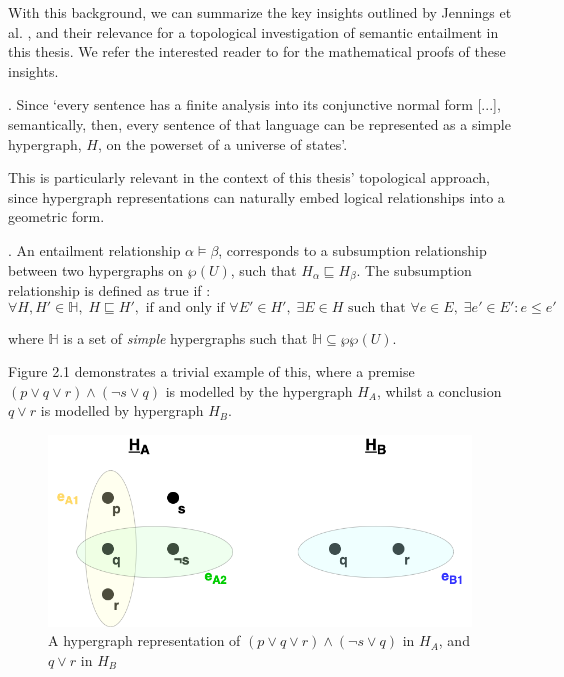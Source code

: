 \documentclass[12pt,twoside]{report}
\begin{document}
With this background, we can summarize the key insights outlined by Jennings et al. \cite{leibnizianAnalysis}, and their relevance for a topological investigation of semantic entailment in this thesis. We refer the interested reader to \cite{leibnizianAnalysis} for the mathematical proofs of these insights. \newline \par {}. Since `every sentence has a finite analysis into its conjunctive normal form [...], semantically, then, every sentence of that language can be represented as a simple hypergraph, $H$, on the powerset of a universe of states'. \newline \par
This is particularly relevant in the context of this thesis' topological approach, since hypergraph representations can naturally embed logical relationships into a geometric form. \newline \par {}. An entailment relationship $\alpha \models \beta$, corresponds to a subsumption relationship between two hypergraphs on $\wp(U)$, such that $H_{\alpha} \sqsubseteq H_{\beta}$. The subsumption relationship is defined as true if \cite{leibnizianAnalysis}: 
$$
\forall H, H' \in \mathbb{H},\; H \sqsubseteq H',
\text{ if and only if }
\forall E' \in H',\; \exists E \in H \text{ such that } 
\forall e \in E,\; \exists e' \in E' : e \leq e'  
$$ 

where $\mathbb{H}$ is a set of \textit{simple} hypergraphs such that $\mathbb{H} \subseteq \wp\wp(U)$. \newline \par

Figure 2.1 demonstrates a trivial example of this, where a premise $(p \lor q \lor r) \land (\neg s \lor q) $  is modelled by the hypergraph $H_A$, whilst a conclusion $q \lor r$ is modelled by hypergraph $H_B$.

\begin{figure}[H]
\centering
\includegraphics[width = 1\hsize]{./figures/HypergraphIntro.drawio.png}
\caption{A hypergraph representation of $(p \lor q \lor r) \land (\neg s \lor q)$ in $H_A$, and $q \lor r$ in $H_B$}
\label{fig:Hypergraphs}
\end{figure}
\end{document}
